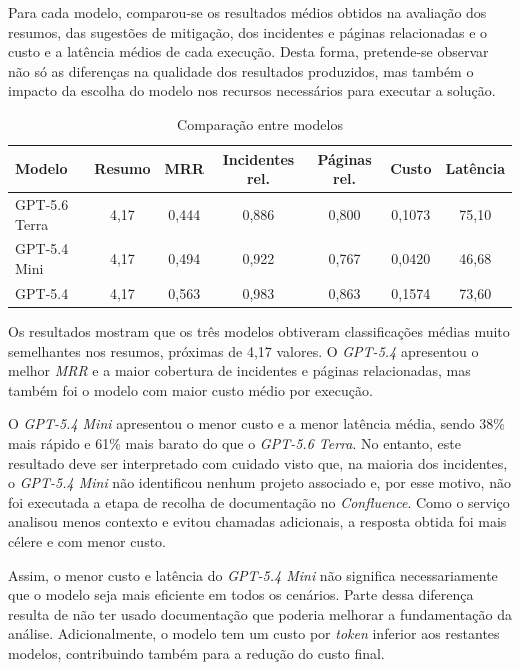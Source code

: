 		Para cada modelo, comparou-se os resultados médios obtidos na avaliação dos resumos, das sugestões de mitigação, dos incidentes e páginas relacionadas e o custo e a latência médios de cada execução. Desta forma, pretende-se observar não só as diferenças na qualidade dos resultados produzidos, mas também o impacto da escolha do modelo nos recursos necessários para executar a solução.
		
		\begin{table}[H]
			\centering
			\small
			\begin{tabular}{lcccccc}
				\hline
				\textbf{Modelo} & \textbf{Resumo} & \textbf{MRR} & \textbf{Incidentes rel.} & \textbf{Páginas rel.} & \textbf{Custo} & \textbf{Latência} \\
				\hline
				GPT-5.6 Terra & 4,17 & 0,444 & 0,886 & 0,800 & 0,1073 & 75,10 \\
				\hline
				GPT-5.4 Mini & 4,17 & 0,494 & 0,922 & 0,767 & 0,0420 & 46,68 \\
				\hline
				GPT-5.4 & 4,17 & 0,563 & 0,983 & 0,863 & 0,1574 & 73,60 \\
				\hline
			\end{tabular}
			\caption[Comparação entre modelos]{Comparação entre modelos}
			\label{tab:comparacao-modelos}
		\end{table}
		
		Os resultados mostram que os três modelos obtiveram classificações médias muito semelhantes nos resumos, próximas de 4,17 valores. O \textit{GPT-5.4} apresentou o melhor \textit{MRR} e a maior cobertura de incidentes e páginas relacionadas, mas também foi o modelo com maior custo médio por execução.
		
		O \textit{GPT-5.4 Mini} apresentou o menor custo e a menor latência média, sendo 38\% mais rápido e 61\% mais barato do que o \textit{GPT-5.6 Terra}. No entanto, este resultado deve ser interpretado com cuidado visto que, na maioria dos incidentes, o \textit{GPT-5.4 Mini} não identificou nenhum projeto associado e, por esse motivo, não foi executada a etapa de recolha de documentação no \textit{Confluence}. Como o serviço analisou menos contexto e evitou chamadas adicionais, a resposta obtida foi mais célere e com menor custo.
		
		Assim, o menor custo e latência do \textit{GPT-5.4 Mini} não significa necessariamente que o modelo seja mais eficiente em todos os cenários. Parte dessa diferença resulta de não ter usado documentação que poderia melhorar a fundamentação da análise. Adicionalmente, o modelo tem um custo por \textit{token} inferior aos restantes modelos, contribuindo também para a redução do custo final.
		
